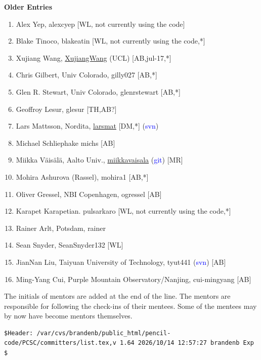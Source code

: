 \documentclass{article}
\def\blue{\textcolor{blue}}
\begin{document}
\noindent
{\Large\bf Older Entries}

\begin{enumerate}\itemsep-0.2mm
\item Alex Yep, alexcyep [WL, not currently using the code]
\item Blake Tinoco, blakeatin [WL, not currently using the code,*]
\item Xujiang Wang, \url{XujiangWang} (UCL) [AB,jul-17,*]
\item Chris Gilbert, Univ Colorado, gilly027 [AB,*]
\item Glen R. Stewart, Univ Colorado, glenrstewart [AB,*]
\item Geoffroy Lesur, glesur [TH,AB?]
\item Lars Mattsson, Nordita, \url{larsmat} [DM,*] (\blue{svn})
\item Michael Schliephake michs [AB]
\item Miikka V\"ais\"al\"a, Aalto Univ., \url{miikkavaisala} (\blue{git}) [MR] 
\item Mohira Ashurova (Rassel), mohira1 [AB,*]
\item Oliver Gressel, NBI Copenhagen, ogressel [AB]
\item Karapet Karapetian. pulsarkaro [WL, not currently using the code,*] %
\item Rainer Arlt, Potsdam, rainer
\item Sean Snyder, SeanSnyder132 [WL] %
\item JianNan Liu, Taiyuan University of Technology, tyut441 (\blue{svn}) [AB]
\item Ming-Yang Cui, Purple Mountain Observatory/Nanjing, cui-mingyang [AB] %
\end{enumerate}

\vfill\bigskip\noindent
The initials of mentors are added at the end of the line.
The mentors are responsible for following the check-ins of their mentees.
Some of the mentees may by now have become mentors themselves.
\tiny\begin{verbatim}
$Header: /var/cvs/brandenb/public_html/pencil-code/PCSC/committers/list.tex,v 1.64 2026/10/14 12:57:27 brandenb Exp $
\end{verbatim}
\end{document}
